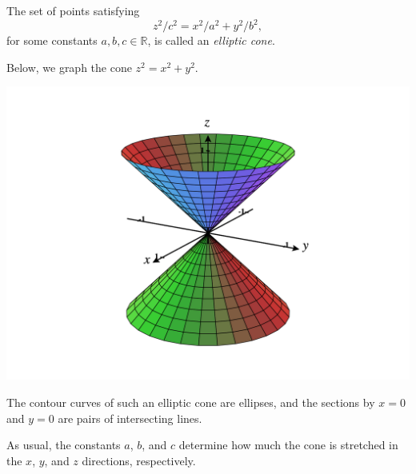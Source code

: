 \documentclass{ximera}
\begin{document}
\begin{example}
The set of points satisfying
\[
z^2/c^2 = x^2/a^2 + y^2/b^2,
\]
for some constants $a,b,c\in\mathbb{R}$, is called an \emph{elliptic cone}.

Below, we graph the cone $z^2 = x^2+y^2$.

\begin{image}
\includegraphics[width = \textwidth]{CalcPlot3D-cone}
\end{image}

The contour curves of such an elliptic cone are ellipses, and the sections by $x=0$ and $y=0$ are pairs of intersecting lines.

As usual, the constants $a$, $b$, and $c$ determine how much the cone is stretched in the $x$, $y$, and $z$ directions, respectively. 
\end{example}
\end{document}

